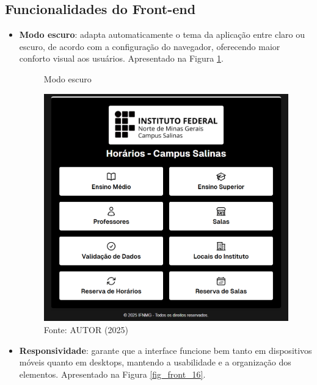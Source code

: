 \subsection{Funcionalidades do Front-end}

\begin{itemize}
    \item \textbf{Modo escuro}: adapta automaticamente o tema da aplicação entre claro ou escuro, de acordo com a configuração do navegador, oferecendo maior conforto visual aos usuários. Apresentado na Figura \ref{fig_front_15}.

    \begin{figure}[htb]
        \centering
        \caption{Modo escuro}
        \includegraphics[width=1\textwidth]{Figuras/front-15.png}
        \caption*{Fonte: AUTOR (2025)}
        \label{fig_front_15}
    \end{figure}

    \item \textbf{Responsividade}: garante que a interface funcione bem tanto em dispositivos móveis quanto em desktops, mantendo a usabilidade e a organização dos elementos. Apresentado na Figura \ref{fig_front_16}.


\end{itemize}

